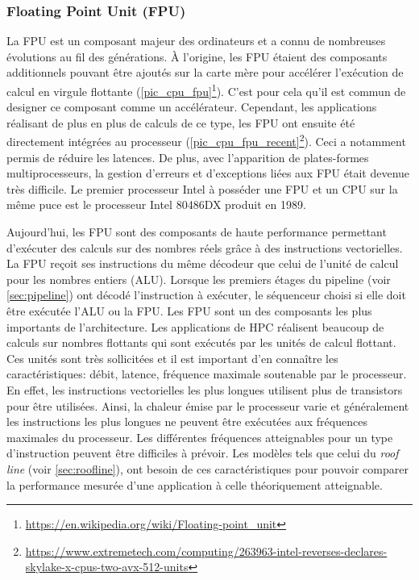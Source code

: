    \subsubsection{Floating Point Unit (FPU)}
        La FPU est un composant majeur des ordinateurs et a connu de nombreuses évolutions au fil des générations. À l'origine, les FPU étaient des composants additionnels pouvant être ajoutés sur la carte mère pour accélérer l'exécution de calcul en virgule flottante (\autoref{pic_cpu_fpu}\footnote{\url{https://en.wikipedia.org/wiki/Floating-point_unit}}). C'est pour cela qu'il est commun de designer ce composant comme un accélérateur. Cependant, les applications réalisant de plus en plus de calculs de ce type, les FPU ont ensuite été directement intégrées au processeur (\autoref{pic_cpu_fpu_recent}\footnote{\url{https://www.extremetech.com/computing/263963-intel-reverses-declares-skylake-x-cpus-two-avx-512-units}}). Ceci a notamment permis de réduire les latences. De plus, avec l'apparition de plates-formes multiprocesseurs, la gestion d'erreurs et d'exceptions liées aux FPU était devenue très difficile. Le premier processeur Intel à posséder une FPU et un CPU sur la même puce est le processeur Intel 80486DX produit en 1989.

        Aujourd'hui, les FPU sont des composants de haute performance permettant d'exécuter des calculs sur des nombres réels grâce à des instructions vectorielles. La FPU reçoit ses instructions du même décodeur que celui de l'unité de calcul pour les nombres entiers (ALU). Lorsque les premiers étages du pipeline (voir \autoref{sec:pipeline}) ont décodé l'instruction à exécuter, le séquenceur choisi si elle doit être exécutée l'ALU ou la FPU. 
        Les FPU sont un des composants les plus importants de l'architecture. Les applications de HPC réalisent beaucoup de calculs sur nombres flottants qui sont exécutés par les unités de calcul flottant. Ces unités sont très sollicitées et il est important d'en connaître les caractéristiques: débit, latence, fréquence maximale soutenable par le processeur. En effet, les instructions vectorielles les plus longues utilisent plus de transistors pour être utilisées. Ainsi, la chaleur émise par le processeur varie et généralement les instructions les plus longues ne peuvent être exécutées aux fréquences maximales du processeur. Les différentes fréquences atteignables pour un type d'instruction peuvent être difficiles à prévoir.
        Les modèles tels que celui du \textit{roof line} (voir \autoref{sec:roofline}), ont besoin de ces caractéristiques pour pouvoir comparer la performance mesurée d'une application à celle théoriquement atteignable. 
        

